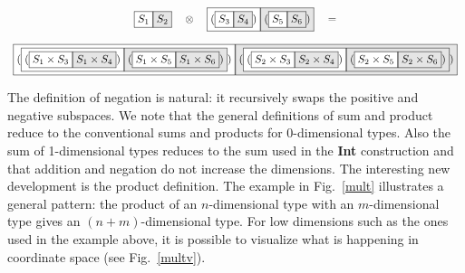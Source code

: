 \documentclass[authoryear,preprint]{sigplanconf}
\newcommand{\nodet}[2]{\fcolorbox{black}{white}{$#1$}\fcolorbox{black}{gray!20}{$#2$}}
\begin{document}
\begin{figure*}
\[\begin{array}{c}
\nodet{S_1}{S_2}
\quad\otimes\quad
\nodet{(\nodet{S_3}{S_4})}{(\nodet{S_5}{S_6})} \quad= \\
\\
\nodet{(\nodet{{(\nodet{S_1 \times S_3}{S_1 \times S_4})}}
              {{(\nodet{S_1 \times S_5}{S_1 \times S_6})}})}
      {(\nodet{{(\nodet{S_2 \times S_3}{S_2 \times S_4})}}
              {{(\nodet{S_2 \times S_5}{S_2 \times S_6})}})}
\end{array}\]
\caption{\label{mult}Example of multiplication of two cubical sets.}
\end{figure*}

\noindent The definition of negation is natural: it recursively swaps the
positive and negative subspaces. We note that the general definitions of sum
and product reduce to the conventional sums and products for 0-dimensional
types. Also the sum of 1-dimensional types reduces to the sum used in the
\textbf{Int} construction and that addition and negation do not increase the
dimensions. The interesting new development is the product definition. The
example in Fig.~\ref{mult} illustrates a general pattern: the product of an
$n$-dimensional type with an $m$-dimensional type gives an
$(n+m)$-dimensional type. For low dimensions such as the ones used in the
example above, it is possible to visualize what is happening in coordinate
space (see Fig.~\ref{multv}).

\begin{figure*}
\caption{\label{multv}Visualization of multiplication of two cubical sets.}
\end{figure*}
\end{document}
